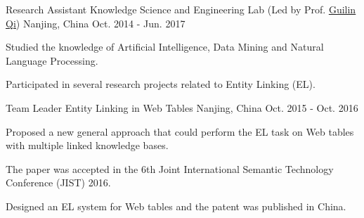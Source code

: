 

\begin{cventries}

  \cventry
    {Research Assistant} %
    {Knowledge Science and Engineering Lab (Led by Prof. \href{http://cse.seu.edu.cn/people/qgl/index.htm}{\underline{Guilin Qi}})} %
    {Nanjing, China} %
    {Oct. 2014 - Jun. 2017} %
    {
      \begin{cvitems} %
        \item {Studied the knowledge of Artificial Intelligence, Data Mining and Natural Language Processing.}
        \item {Participated in several research projects related to Entity Linking (EL).}
      \end{cvitems}
    }

  \cventry
    {Team Leader} %
    {Entity Linking in Web Tables} %
    {Nanjing, China} %
    {Oct. 2015 - Oct. 2016} %
    {
      \begin{cvitems} %
        \item {Proposed a new general approach that could perform the EL task on Web tables with multiple linked knowledge bases.}
        \item {The paper was accepted in the 6th Joint International Semantic Technology Conference (JIST) 2016.}
        \item {Designed an EL system for Web tables and the patent was published in China.}
      \end{cvitems}
    }


\end{cventries}

